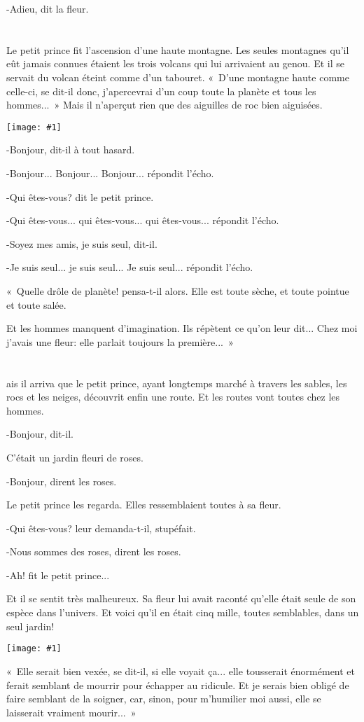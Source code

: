 \documentclass{report}
\newcommand{\parachapter}[2][]{\chapter[#1]{#2}}
\newcommand{\incpic}[1]{%
\begin{center}
    \texttt{[image: \#1]}
\end{center}%
}
\begin{document}
-Adieu, dit la fleur.
\parachapter{} %
Le petit prince fit l'ascension d'une haute montagne. Les seules montagnes qu'il eût jamais connues étaient les trois volcans qui lui arrivaient au genou. Et il se servait du volcan éteint comme d'un tabouret. «~D'une montagne haute comme celle-ci, se dit-il donc, j'apercevrai d'un coup toute la planète et tous les hommes...~» Mais il n'aperçut rien que des aiguilles de roc bien aiguisées.

\incpic{pic/image35.png}

-Bonjour, dit-il à tout hasard.

-Bonjour... Bonjour... Bonjour... répondit l'écho.

-Qui êtes-vous? dit le petit prince.

-Qui êtes-vous... qui êtes-vous... qui êtes-vous... répondit l'écho.

-Soyez mes amis, je suis seul, dit-il.

-Je suis seul... je suis seul... Je suis seul... répondit l'écho.

«~Quelle drôle de planète! pensa-t-il alors. Elle est toute sèche, et toute pointue et toute salée.

Et les hommes manquent d'imagination. Ils répètent ce qu'on leur dit... Chez moi j'avais une fleur: elle parlait toujours la première...~»
\parachapter{} %
ais il arriva que le petit prince, ayant longtemps marché à travers les sables, les rocs et les neiges, découvrit enfin une route. Et les routes vont toutes chez les hommes.

-Bonjour, dit-il.

C'était un jardin fleuri de roses.

-Bonjour, dirent les roses.

Le petit prince les regarda. Elles ressemblaient toutes à sa fleur.

-Qui êtes-vous? leur demanda-t-il, stupéfait.

-Nous sommes des roses, dirent les roses.

-Ah! fit le petit prince...

Et il se sentit très malheureux. Sa fleur lui avait raconté qu'elle était seule de son espèce dans l'univers. Et voici qu'il en était cinq mille, toutes semblables, dans un seul jardin!

\incpic{pic/image36.jpeg}

«~Elle serait bien vexée, se dit-il, si elle voyait ça... elle tousserait énormément et ferait semblant de mourrir pour échapper au ridicule. Et je serais bien obligé de faire semblant de la soigner, car, sinon, pour m'humilier moi aussi, elle se laisserait vraiment mourir...~»
\end{document}
